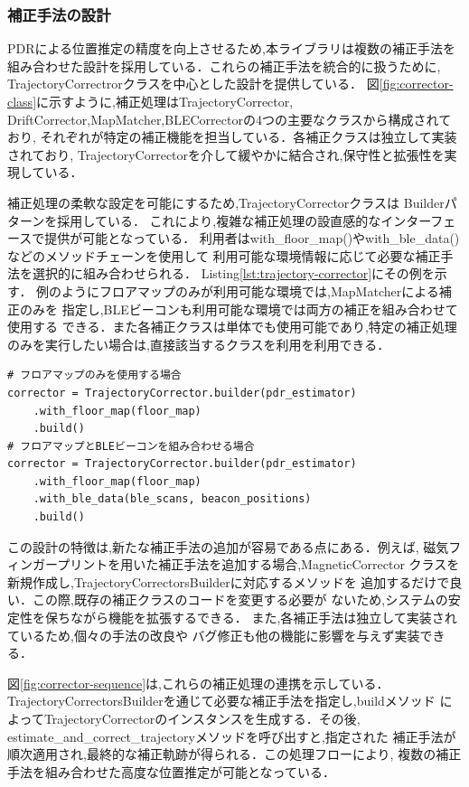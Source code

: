 
\subsubsection{補正手法の設計}

PDRによる位置推定の精度を向上させるため,本ライブラリは複数の補正手法を
組み合わせた設計を採用している．これらの補正手法を統合的に扱うために,
TrajectoryCorrectrorクラスを中心とした設計を提供している．
図\ref{fig:corrector-class}に示すように,補正処理はTrajectoryCorrector,
DriftCorrector,MapMatcher,BLECorrectorの4つの主要なクラスから構成されており,
それぞれが特定の補正機能を担当している．各補正クラスは独立して実装されており,
TrajectoryCorrectorを介して緩やかに結合され,保守性と拡張性を実現している．

補正処理の柔軟な設定を可能にするため,TrajectoryCorrectorクラスは
Builderパターンを採用している．
これにより,複雑な補正処理の設直感的なインターフェースで提供が可能となっている．
利用者はwith\_floor\_map()やwith\_ble\_data()などのメソッドチェーンを使用して
利用可能な環境情報に応じて必要な補正手法を選択的に組み合わせられる．
Listing\ref{lst:trajectory-corrector}にその例を示す．
例のようにフロアマップのみが利用可能な環境では,MapMatcherによる補正のみを
指定し,BLEビーコンも利用可能な環境では両方の補正を組み合わせて使用する
できる．また各補正クラスは単体でも使用可能であり,特定の補正処理
のみを実行したい場合は,直接該当するクラスを利用を利用できる．

\begin{lstlisting}[caption={TrajectoryCorrectorの使用例},label=lst:trajectory-corrector,float=h]
# フロアマップのみを使用する場合
corrector = TrajectoryCorrector.builder(pdr_estimator)
    .with_floor_map(floor_map)
    .build()
# フロアマップとBLEビーコンを組み合わせる場合
corrector = TrajectoryCorrector.builder(pdr_estimator)
    .with_floor_map(floor_map)
    .with_ble_data(ble_scans, beacon_positions)
    .build()
\end{lstlisting}

この設計の特徴は,新たな補正手法の追加が容易である点にある．例えば,
磁気フィンガープリントを用いた補正手法を追加する場合,MagneticCorrector
クラスを新規作成し,TrajectoryCorrectorsBuilderに対応するメソッドを
追加するだけで良い．この際,既存の補正クラスのコードを変更する必要が
ないため,システムの安定性を保ちながら機能を拡張するできる．
また,各補正手法は独立して実装されているため,個々の手法の改良や
バグ修正も他の機能に影響を与えず実装できる．

図\ref{fig:corrector-sequence}は,これらの補正処理の連携を示している．
TrajectoryCorrectorsBuilderを通じて必要な補正手法を指定し,buildメソッド
によってTrajectoryCorrectorのインスタンスを生成する．その後,
estimate\_and\_correct\_trajectoryメソッドを呼び出すと,指定された
補正手法が順次適用され,最終的な補正軌跡が得られる．この処理フローにより,
複数の補正手法を組み合わせた高度な位置推定が可能となっている．

